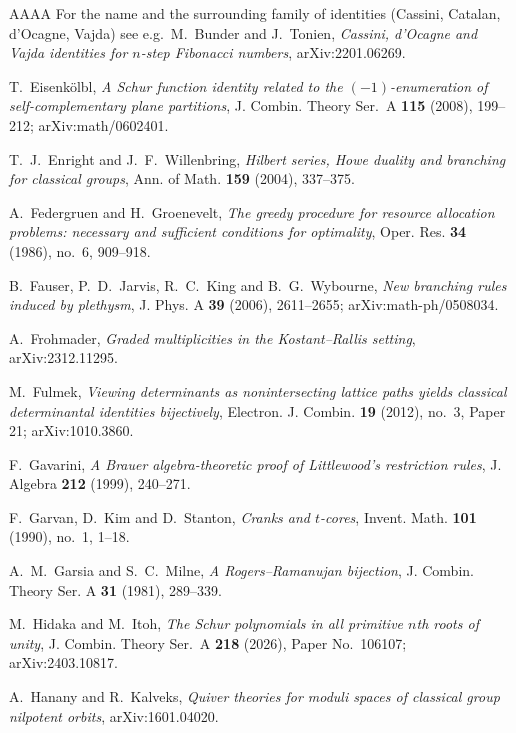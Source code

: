 \documentclass[11pt,reqno]{amsart}
\theoremstyle{plain}
\theoremstyle{definition}
\begin{document}
\begin{thebibliography}{AAAA}
 For the name and the surrounding family of identities (Cassini, Catalan,
d'Ocagne, Vajda) see e.g.\ M.~Bunder and J.~Tonien, \emph{Cassini, d'Ocagne and Vajda identities for
$n$-step Fibonacci numbers}, arXiv:2201.06269.

 T.~Eisenk\"olbl, \emph{A Schur function identity related to the
$(-1)$-enumeration of self-complementary plane partitions}, J. Combin. Theory Ser.~A \textbf{115}
(2008), 199--212; arXiv:math/0602401.

 T.~J.~Enright and J.~F.~Willenbring, \emph{Hilbert series, Howe duality and
branching for classical groups}, Ann. of Math. \textbf{159} (2004), 337--375.

 A.~Federgruen and H.~Groenevelt, \emph{The greedy procedure for resource
allocation problems: necessary and sufficient conditions for optimality}, Oper. Res. \textbf{34}
(1986), no.~6, 909--918.

 B.~Fauser, P.~D.~Jarvis, R.~C.~King and B.~G.~Wybourne, \emph{New branching
rules induced by plethysm}, J. Phys. A \textbf{39} (2006), 2611--2655; arXiv:math-ph/0508034.

 A.~Frohmader, \emph{Graded multiplicities in the Kostant--Rallis
setting}, arXiv:2312.11295.

 M.~Fulmek, \emph{Viewing determinants as nonintersecting lattice
paths yields classical determinantal identities bijectively}, Electron. J. Combin. \textbf{19}
(2012), no.~3, Paper 21; arXiv:1010.3860.

 F.~Gavarini, \emph{A Brauer algebra-theoretic proof of Littlewood's
restriction rules}, J. Algebra \textbf{212} (1999), 240--271.

 F.~Garvan, D.~Kim and D.~Stanton, \emph{Cranks and $t$-cores},
Invent. Math. \textbf{101} (1990), no.~1, 1--18.

 A.~M.~Garsia and S.~C.~Milne, \emph{A Rogers--Ramanujan bijection},
J. Combin. Theory Ser. A \textbf{31} (1981), 289--339.

 M.~Hidaka and M.~Itoh, \emph{The Schur polynomials in all primitive $n$th roots
of unity}, J. Combin. Theory Ser.~A \textbf{218} (2026), Paper No.~106107; arXiv:2403.10817.

 A.~Hanany and R.~Kalveks, \emph{Quiver theories for moduli spaces of classical
group nilpotent orbits}, arXiv:1601.04020.


\end{thebibliography}
\end{document}

